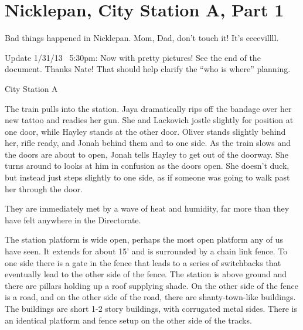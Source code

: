 \setcounter{chapter}{ 14 }
\chapter{\textbf{Nicklepan, City Station A, Part 1} }








Bad things happened in Nicklepan.  Mom, Dad, don't touch it!  It's eeeevillll.



Update 1/31/13 ~5:30pm:  Now with pretty pictures!  See the end of the document.  Thanks Nate!  That should help clarify the ``who is where'' planning.



\noindent\hrulefill





 {\LARGE City Station A } 



The train pulls into the station.  Jaya dramatically rips off the bandage over her new tattoo and readies her gun.  She and Lackovich jostle slightly for position at one door, while Hayley stands at the other door.  Oliver stands slightly behind her, rifle ready, and Jonah behind them and to one side.  As the train slows and the doors are about to open, Jonah tells Hayley to get out of the doorway.  She turns around to looks at him in confusion as the doors open.  She doesn't duck, but instead just steps slightly to one side, as if someone was going to walk past her through the door.



They are immediately met by a wave of heat and humidity, far more than they have felt anywhere in the Directorate.



The station platform is wide open, perhaps the most open platform any of us have seen.  It extends for about 15' and is surrounded by a chain link fence.   To one side there is a gate in the fence that leads to a series of switchbacks that eventually lead to the other side of the fence.  The station is above ground and there are pillars holding up a roof supplying shade.  On the other side of the fence is a road, and on the other side of the road, there are shanty-town-like buildings. The buildings are short 1-2 story buildings, with corrugated metal sides.  There is an identical platform and fence setup on the other side of the tracks.




